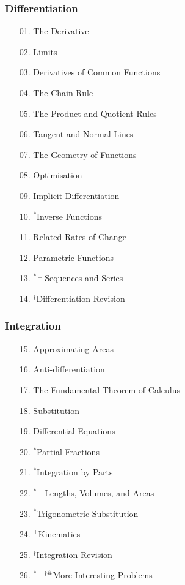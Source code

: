 \subsubsection*{Differentiation}
\begin{enumerate}
  \item[01.] The Derivative
  \item[02.] Limits
  \item[03.] Derivatives of Common Functions
  \item[04.] The Chain Rule
  \item[05.] The Product and Quotient Rules
  \item[06.] Tangent and Normal Lines
  \item[07.] The Geometry of Functions
  \item[08.] Optimisation
  \item[09.] Implicit Differentiation
  \item[10.] $^*$Inverse Functions
  \item[11.] Related Rates of Change
  \item[12.] Parametric Functions
  \item[13.] $^{*\perp}$Sequences and Series
  \item[14.] $^\dagger$Differentiation Revision
\end{enumerate}

\subsubsection*{Integration}
\begin{enumerate}
  \item[15.] Approximating Areas
  \item[16.] Anti-differentiation
  \item[17.] The Fundamental Theorem of Calculus
  \item[18.] Substitution
  \item[19.] Differential Equations
  \item[20.] $^*$Partial Fractions
  \item[21.] $^*$Integration by Parts
  \item[22.] $^{*\perp}$Lengths, Volumes, and Areas
  \item[23.] $^*$Trigonometric Substitution
  \item[24.] $^\perp$Kinematics
  \item[25.] $^\dagger$Integration Revision
  \item[26.] $^{*\perp\dagger\skull}$More Interesting Problems
\end{enumerate}

